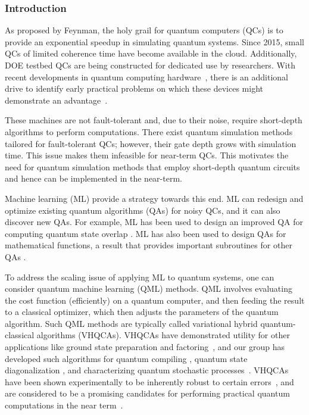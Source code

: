 \documentclass[11pt]{article}
\begin{document}
\subsubsection{ Introduction} As proposed by Feynman, the holy grail for quantum computers (QCs) is to provide an exponential speedup in simulating quantum systems. Since 2015, small QCs of limited coherence time have become available in the cloud. Additionally, DOE testbed QCs are being constructed for dedicated use by researchers. With recent developments in quantum computing
hardware~\cite{Corcoles2015,Riste2015,Kelly2015,Barends2016,Roushan2017}, there is an additional drive to identify early practical problems on which these devices might demonstrate an advantage~\cite{Mohseni2017,Boixo2016}.


These machines are not fault-tolerant and, due to their noise, require short-depth algorithms to perform computations. There exist quantum simulation methods \cite{6} tailored for fault-tolerant QCs; however, their gate depth grows with simulation time. This issue makes them infeasible for near-term QCs. This motivates the need for quantum simulation methods that employ short-depth quantum circuits and hence can be implemented in the near-term. 

Machine learning (ML) provide a strategy towards this end. ML can redesign and optimize existing quantum algorithms (QAs) for noisy QCs, and it can also discover new QAs. For example, ML has been used to design an improved QA for computing quantum state overlap \cite{Cincio2018}. ML has also been used to design QAs for mathematical functions, a result that provides important subroutines for other QAs \cite{Mitarai2018}. 

To address the scaling issue of applying ML to quantum systems, one can consider quantum machine learning (QML) methods. QML involves evaluating the cost function (efficiently) on a quantum computer, and then feeding the result to a classical optimizer, which then adjusts the parameters of the quantum algorithm. Such QML methods are typically called variational hybrid quantum-classical algorithms (VHQCAs). VHQCAs have demonstrated utility for other applications like ground state preparation \cite{Peruzzo2013} and factoring~\cite{Anschuetz2018}, and our group has developed such algorithms for quantum compiling \cite{Khatri2018}, quantum state diagonalization \cite{LaRose2018}, and characterizing quantum stochastic processes~\cite{Arrasmith2018}. VHQCAs have been shown experimentally to be inherently robust to certain errors~\cite{OMalley2016}, and are considered to be a promising candidates for performing practical
quantum computations in the near term~\cite{Wecker:2015bk,Mueck2015}. 
\end{document}
